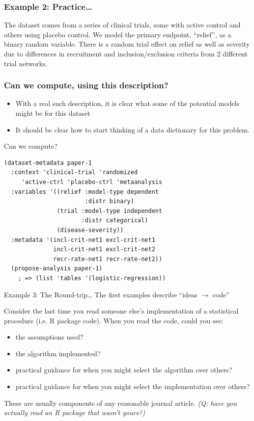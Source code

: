 \documentclass{beamer}
\begin{document}
\begin{frame}
  \frametitle{Example 2: Practice\ldots} 
  \label{example2}
  The dataset comes from a series of clinical trials, some with active
  control and others using placebo control.  We model the primary
  endpoint, ``relief'', as a binary random variable.  There is a
  random trial effect on relief as well as severity due to differences
  in recruitment and inclusion/exclusion criteria from 2 different
  trial networks.
\end{frame}

\begin{frame}
  \frametitle{Can we compute, using this description?}
  \begin{itemize}
  \item With a real such description, it is clear what some of the
    potential models might be for this dataset
  \item It should be clear how to start thinking of a data dictionary
    for this problem.
  \end{itemize}
\end{frame}

\begin{frame}[fragile]{Can we compute?}
\begin{verbatim}
(dataset-metadata paper-1
  :context 'clinical-trial 'randomized 
     'active-ctrl 'placebo-ctrl 'metaanalysis
  :variables '((relief :model-type dependent
                       :distr binary)
               (trial :model-type independent
                      :distr categorical)
               (disease-severity))
  :metadata '(incl-crit-net1 excl-crit-net1
              incl-crit-net1 excl-crit-net2
              recr-rate-net1 recr-rate-net2))
  (propose-analysis paper-1)
    ; => (list 'tables '(logistic-regression))
\end{verbatim}
\end{frame}

\begin{frame}{Example 3: The Round-trip\ldots} 
  \label{example3}
  The first examples describe ``ideas $\rightarrow$ code''

  Consider the last time you read someone else's implementation of a
  statistical procedure (i.e. R package code).  When you read the
  code, could you see:
  \begin{itemize}
  \item the assumptions used?
  \item the algorithm implemented?
  \item practical guidance for when you might select the algorithm
    over others? 
  \item practical guidance for when you might select the
    implementation over others? 
  \end{itemize}
  These are usually components of any reasonable journal article.
  \textit{(Q: have you actually read an R package that wasn't yours?)}
\end{frame}
\end{document}
